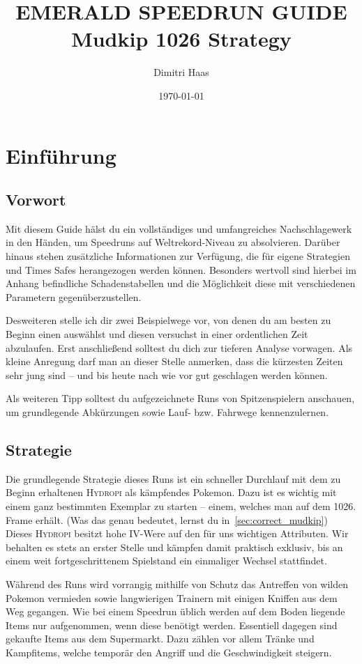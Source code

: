 \documentclass[11pt,a4paper,titlepage]{article}
\title{\blue EMERALD SPEEDRUN GUIDE \\
\blueb Mudkip 1026 Strategy}
\author{Dimitri Haas}
\date{\today}
\begin{document}
\maketitle

\section{Einführung}{%
\subsection{Vorwort}{
\label{sec:preface}
Mit diesem Guide hälst du ein vollständiges und umfangreiches Nachschlagewerk in den Händen, um Speedruns auf Weltrekord-Niveau zu absolvieren.
Darüber hinaus stehen zusätzliche Informationen zur Verfügung, die für eigene Strategien und Times Safes herangezogen werden können. Besonders wertvoll sind hierbei im Anhang befindliche Schadenstabellen und die Möglichkeit diese mit verschiedenen Parametern gegenüberzustellen. 

Desweiteren stelle ich dir zwei Beispielwege vor, von denen du am besten zu Beginn einen auswählst und diesen versuchst in einer ordentlichen Zeit abzulaufen. Erst anschließend solltest du dich zur tieferen Analyse vorwagen.
Als kleine Anregung darf man an dieser Stelle anmerken, dass die kürzesten Zeiten sehr jung sind – und bis heute nach wie vor gut geschlagen werden können.

Als weiteren Tipp solltest du aufgezeichnete Runs von Spitzenspielern anschauen, um grundlegende Abkürzungen sowie Lauf- bzw. Fahrwege kennenzulernen.%

\subsection{Strategie}{
\label{sec:strategy_explanation}
Die grundlegende Strategie dieses Runs ist ein schneller Durchlauf mit dem zu Beginn erhaltenen \textsc{Hydropi} als kämpfendes Pokemon. Dazu ist es wichtig mit einem ganz bestimmten Exemplar zu starten -- einem, welches man auf dem 1026. Frame erhält. (Was das genau bedeutet, lernst du in~\ref{sec:correct_mudkip}) Dieses \textsc{Hydropi} besitzt hohe IV-Were auf den für uns wichtigen Attributen. Wir behalten es stets an erster Stelle und kämpfen damit praktisch exklusiv, bis an einem weit fortgeschrittenem Spielstand ein einmaliger Wechsel stattfindet.

Während des Runs wird vorrangig mithilfe von Schutz das Antreffen von wilden Pokemon vermieden sowie langwierigen Trainern mit einigen Kniffen aus dem Weg gegangen. Wie bei einem Speedrun üblich werden auf dem Boden liegende Items nur aufgenommen, wenn diese benötigt werden. Essentiell dagegen sind gekaufte Items aus dem Supermarkt. Dazu zählen vor allem Tränke und Kampfitems, welche temporär den Angriff und die Geschwindigkeit steigern.

}}}
\end{document}

